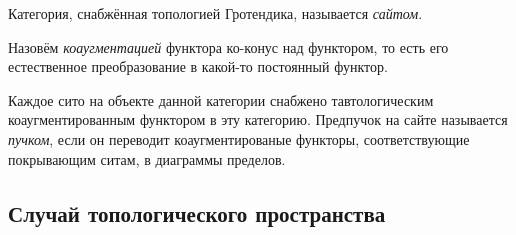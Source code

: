 \documentclass[
	extrafontsizes,
	11pt,
	hyphens,
]{memoir}
\begin{document}
\begin{definition}
Категория, снабжённая топологией Гротендика, называется \emph{сайтом}.
\end{definition}

\begin{definition}
Назовём \emph{коаугментацией} функтора ко-конус над функтором, то есть его естественное преобразование в какой-то постоянный функтор.
\end{definition}

\begin{definition}
Каждое сито на объекте данной категории снабжено тавтологическим коаугментированным функтором в эту категорию.
Предпучок на сайте называется \emph{пучком}, если он переводит коаугментированые функторы, соответствующие покрывающим ситам, в диаграммы пределов.
\end{definition}




\subsection{Случай топологического пространства}

\end{document}
